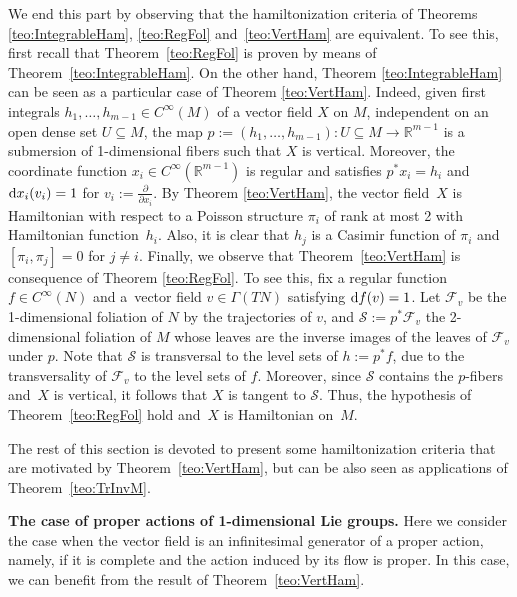\documentclass[pdftex]{sigma}%
\newcommand{\R}[1]{\mathbb{R}^{#1}}
\newcommand{\dd}{{\rm d}}
\numberwithin{equation}{section}
\begin{document}
We end this part by observing that the hamiltonization criteria of Theorems \ref{teo:IntegrableHam}, \ref{teo:RegFol} and~\ref{teo:VertHam} are equivalent. To see this, first recall that Theorem~\ref{teo:RegFol} is proven by means of Theorem~\ref{teo:IntegrableHam}. On the other hand, Theorem \ref{teo:IntegrableHam} can be seen as a particular case of Theorem \ref{teo:VertHam}. Indeed, given first integrals $h_1,\dots,h_{m-1}\in C^{\infty}(M)$ of a vector field $X$ on $M$, independent on an open dense set $U\subseteq M$, the map $p:=(h_1,\dots,h_{m-1})\colon U\subseteq M \to \R{m-1}$ is a submersion of 1-dimensional fibers such that $X$ is vertical. Moreover, the coordinate function $x_i\in C^{\infty}(\R{m-1})$ is regular and satisfies $p^*x_{i}=h_i$ and $\dd x_{i}(v_{i})=1$ for $v_i:=\frac{\partial}{\partial x_{i}}$. By Theorem \ref{teo:VertHam}, the vector field~$X$ is Hamiltonian with respect to a Poisson structure $\pi_{i}$ of rank at most 2 with Hamiltonian function~$h_{i}$. Also, it is clear that $h_{j}$ is a Casimir function of $\pi_i$ and $[\pi_{i},\pi_{j}]=0$ for $j\neq i$. Finally, we observe that Theorem~\ref{teo:VertHam} is consequence of Theorem \ref{teo:RegFol}. To see this, fix a regular function $f\in C^{\infty}(N)$ and a~vector field $v\in\Gamma(TN)$ satisfying $\dd f(v)=1$. Let $\mathcal{F}_{v}$ be the 1-dimensional foliation of $N$ by the trajectories of $v$, and $\mathcal{S}:=p^{*}\mathcal{F}_{v}$ the 2-dimensional foliation of $M$ whose leaves are the inverse images of the leaves of $\mathcal{F}_{v}$ under $p$. Note that $\mathcal{S}$ is transversal to the level sets of $h:=p^{*}f$, due to the transversality of $\mathcal{F}_{v}$ to the level sets of $f$. Moreover, since $\mathcal{S}$ contains the $p$-fibers and~$X$ is vertical, it follows that $X$ is tangent to $\mathcal{S}$. Thus, the hypothesis of Theorem~\ref{teo:RegFol} hold and~$X$ is Hamiltonian on~$M$.

The rest of this section is devoted to present some hamiltonization criteria that are motivated by Theorem~\ref{teo:VertHam}, but can be also seen as applications of Theorem~\ref{teo:TrInvM}.

{\bf The case of proper actions of 1-dimensional Lie groups.} Here we consider the case when the vector field is an infinitesimal generator of a proper action, namely, if it is complete and the action induced by its flow is proper. In this case, we can benefit from the result of Theorem~\ref{teo:VertHam}.
\end{document}
